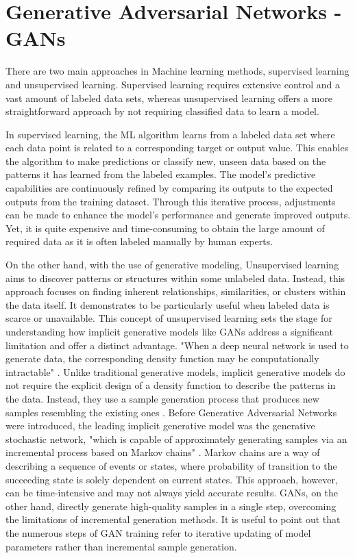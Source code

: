 \section{Generative Adversarial Networks - GANs}
\label{GAN}

There are two main approaches in Machine learning methods, 
supervised learning and unsupervised learning. Supervised learning requires extensive control and a vast amount of labeled data sets, whereas unsupervised learning offers a more straightforward approach by not requiring classified data to learn a model.

In supervised learning, the ML algorithm learns from a labeled data set where each data point is related to a corresponding target or output value. This enables the algorithm to make predictions or classify new, unseen data based on the patterns it has learned from the labeled examples. The model's predictive capabilities are continuously refined by comparing its outputs to the expected outputs from the training dataset. Through this iterative process, adjustments can be made to enhance the model's performance and generate improved outputs. Yet, it is quite expensive and time-consuming to obtain the large amount of required data as it is often labeled manually by human experts.

On the other hand, with the use of generative modeling, Unsupervised learning aims to discover patterns or structures within some unlabeled data. Instead, this approach focuses on finding inherent relationships, similarities, or clusters within the data itself. It demonstrates to be particularly useful when labeled data is scarce or unavailable. This concept of unsupervised learning sets the stage for understanding how implicit generative models like GANs address a significant limitation and offer a distinct advantage. "When a deep neural network is used to generate data, the corresponding density function may be computationally intractable" \citep{goodfellowGAN}. Unlike traditional generative models, implicit generative models do not require the explicit design of a density function to describe the patterns in the data. Instead, they use a sample generation process that produces new samples resembling the existing ones \citep{goodfellowGAN}. Before Generative Adversarial Networks were introduced, the leading implicit generative model was the generative stochastic network, "which is capable of approximately generating samples via an incremental process based on Markov chains" \citep{goodfellowGAN}. Markov chains are a way of describing a sequence of events or states, where probability of transition to the succeeding state is solely dependent on current states. This approach, however,  can be time-intensive and may not always yield accurate results. GANs, on the other hand, directly generate high-quality samples in a single step, overcoming the limitations of incremental generation methods. It is useful to point out that the numerous steps of GAN training refer to iterative updating of model parameters rather than incremental sample generation.


